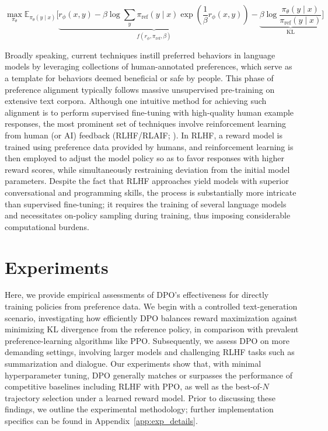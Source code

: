 \begin{equation}\label{eq:AC}
    \max_{\pi_{\theta}}\mathbb{E}_{\pi_{\theta}(y\mid x)}\bigg[\underbrace{r_{\phi}(x, y) -\beta\log\sum_{y}\pi_\text{ref}(y\mid x)\exp\left(\frac{1}{\beta}r_{\phi}(x, y)\right)}_{f(r_{\phi}, \pi_\text{ref}, \beta)} - \underbrace{\beta\log\frac{\pi_{\theta}(y\mid x)}{\pi_\text{ref}(y\mid x)}}_{\text{KL}}\bigg]
\end{equation}

Broadly speaking, current techniques instill preferred behaviors in language models by leveraging collections of human-annotated preferences, which serve as a template for behaviors deemed beneficial or safe by people. This phase of preference alignment typically follows massive unsupervised pre-training on extensive text corpora. Although one intuitive method for achieving such alignment is to perform supervised fine-tuning with high-quality human example responses, the most prominent set of techniques involve reinforcement learning from human (or AI) feedback (RLHF/RLAIF; \citep{christiano2017deep,bai2022constitutional}). In RLHF, a reward model is trained using preference data provided by humans, and reinforcement learning is then employed to adjust the model policy so as to favor responses with higher reward scores, while simultaneously restraining deviation from the initial model parameters. Despite the fact that RLHF approaches yield models with superior conversational and programming skills, the process is substantially more intricate than supervised fine-tuning; it requires the training of several language models and necessitates on-policy sampling during training, thus imposing considerable computational burdens.

\section{Experiments}
Here, we provide empirical assessments of DPO's effectiveness for directly training policies from preference data. We begin with a controlled text-generation scenario, investigating how efficiently DPO balances reward maximization against minimizing KL divergence from the reference policy, in comparison with prevalent preference-learning algorithms like PPO. Subsequently, we assess DPO on more demanding settings, involving larger models and challenging RLHF tasks such as summarization and dialogue. Our experiments show that, with minimal hyperparameter tuning, DPO generally matches or surpasses the performance of competitive baselines including RLHF with PPO, as well as the best-of-$N$ trajectory selection under a learned reward model. Prior to discussing these findings, we outline the experimental methodology; further implementation specifics can be found in Appendix~\ref{app:exp_details}.

